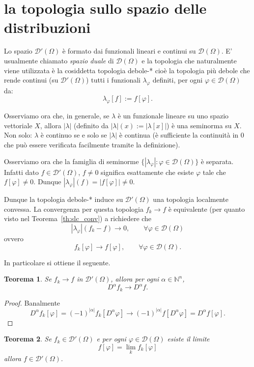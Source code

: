 \documentclass[italian,a4paper,oneside,headinclude]{scrbook}
\renewcommand{\phi}{\varphi}
\newcommand{\D}{\mathcal D}
\newcommand{\NN}{\mathbb N}
\newcommand{\abs}[1]{{\left|#1\right|}}
\newcommand{\defeq}{:=}
\newtheorem{theorem}{Teorema}
\begin{document}
\section{la topologia sullo spazio delle distribuzioni}

Lo spazio $\D'(\Omega)$ è formato dai funzionali lineari e continui su
$\D(\Omega)$. E' usualmente chiamato \emph{spazio duale} di
$\D(\Omega)$ e la topologia che naturalmente viene utilizzata è la
cosiddetta topologia debole-* cioè la topologia più debole che rende
continui (su $\D'(\Omega)$) tutti i funzionali $\lambda_\phi$
definiti, per ogni $\phi \in \D(\Omega)$ da:
\[
   \lambda_\phi[f] \defeq f[\phi].
\]

Osserviamo ora che, in generale, se $\lambda$ è un funzionale lineare
su uno spazio vettoriale $X$, allora $\abs{\lambda}$ (definito da
$\abs{\lambda}(x)\defeq \abs{\lambda[x]}$) è una seminorma su $X$. Non
solo: $\lambda$ è continuo se e solo se $\abs{\lambda}$ è continua
(è sufficiente la continuità in $0$ che può essere
verificata facilmente tramite la definizione).

Osserviamo ora che la famiglia di seminorme
$\{\abs{\lambda_\phi}\colon \phi \in \D(\Omega)\}$ è separata. Infatti
dato $f\in \D'(\Omega)$, $f\neq 0$ significa esattamente che esiste
$\phi$ tale che $f[\phi]\neq 0$. Dunque
$\abs{\lambda_\phi}(f) = \abs{f[\phi]}\neq 0$.

Dunque la topologia debole-* induce su $\D'(\Omega)$ una topologia
localmente convessa. La convergenza per questa topologia $f_k\to f$ è
equivalente (per quanto visto nel Teorema~\ref{th:slc_conv}) a richiedere che
\[
\abs{\lambda_\phi}(f_k-f)\to 0,\qquad \forall \phi\in\D(\Omega)
\]
ovvero
\[
f_k[\phi]\to f[\phi],\qquad \forall \phi\in\D(\Omega).
\]

In particolare si ottiene il seguente.
\begin{theorem}
  Se $f_k\to f$ in $\D'(\Omega)$, allora per ogni $\alpha \in \NN^n$,
  \[
     D^\alpha f_k \to D^\alpha f.
  \]
\end{theorem}
%
\begin{proof}
  Banalmente
  \[
  D^\alpha f_k[\phi] = (-1)^{\abs{\alpha}}f_k[D^\alpha \phi]
  \to (-1)^{\abs{\alpha}} f[D^\alpha \phi] = D^\alpha f[\phi].
  \]
\end{proof}

\begin{theorem}\label{th:distr_puntuale}
  Se $f_k\in \D'(\Omega)$ e per ogni $\phi\in \D(\Omega)$ esiste il limite
  \[
  f[\phi] = \lim_k f_k[\phi]
  \]
  allora $f\in \D'(\Omega)$.
\end{theorem}
\end{document}
